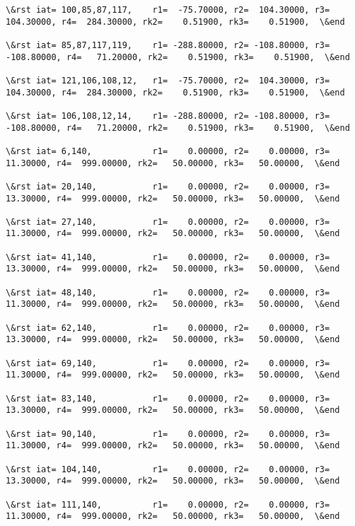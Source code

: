 \documentclass[11pt]{article}
\begin{document}
\begin{Verbatim}[commandchars=\\\{\}]
\&rst iat= 100,85,87,117,    r1=  -75.70000, r2=  104.30000, r3=  104.30000, r4=  284.30000, rk2=    0.51900, rk3=    0.51900,  \&end

\&rst iat= 85,87,117,119,    r1= -288.80000, r2= -108.80000, r3= -108.80000, r4=   71.20000, rk2=    0.51900, rk3=    0.51900,  \&end

\&rst iat= 121,106,108,12,   r1=  -75.70000, r2=  104.30000, r3=  104.30000, r4=  284.30000, rk2=    0.51900, rk3=    0.51900,  \&end

\&rst iat= 106,108,12,14,    r1= -288.80000, r2= -108.80000, r3= -108.80000, r4=   71.20000, rk2=    0.51900, rk3=    0.51900,  \&end

\&rst iat= 6,140,            r1=    0.00000, r2=    0.00000, r3=   11.30000, r4=  999.00000, rk2=   50.00000, rk3=   50.00000,  \&end

\&rst iat= 20,140,           r1=    0.00000, r2=    0.00000, r3=   13.30000, r4=  999.00000, rk2=   50.00000, rk3=   50.00000,  \&end

\&rst iat= 27,140,           r1=    0.00000, r2=    0.00000, r3=   11.30000, r4=  999.00000, rk2=   50.00000, rk3=   50.00000,  \&end

\&rst iat= 41,140,           r1=    0.00000, r2=    0.00000, r3=   13.30000, r4=  999.00000, rk2=   50.00000, rk3=   50.00000,  \&end

\&rst iat= 48,140,           r1=    0.00000, r2=    0.00000, r3=   11.30000, r4=  999.00000, rk2=   50.00000, rk3=   50.00000,  \&end

\&rst iat= 62,140,           r1=    0.00000, r2=    0.00000, r3=   13.30000, r4=  999.00000, rk2=   50.00000, rk3=   50.00000,  \&end

\&rst iat= 69,140,           r1=    0.00000, r2=    0.00000, r3=   11.30000, r4=  999.00000, rk2=   50.00000, rk3=   50.00000,  \&end

\&rst iat= 83,140,           r1=    0.00000, r2=    0.00000, r3=   13.30000, r4=  999.00000, rk2=   50.00000, rk3=   50.00000,  \&end

\&rst iat= 90,140,           r1=    0.00000, r2=    0.00000, r3=   11.30000, r4=  999.00000, rk2=   50.00000, rk3=   50.00000,  \&end

\&rst iat= 104,140,          r1=    0.00000, r2=    0.00000, r3=   13.30000, r4=  999.00000, rk2=   50.00000, rk3=   50.00000,  \&end

\&rst iat= 111,140,          r1=    0.00000, r2=    0.00000, r3=   11.30000, r4=  999.00000, rk2=   50.00000, rk3=   50.00000,  \&end


\end{Verbatim}
\end{document}
